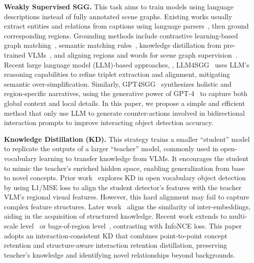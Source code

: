 \textbf{Weakly Supervised SGG.} This task aims to train models using language descriptions instead of fully annotated scene graphs. Existing works usually extract entities and relations from captions using language parsers~\cite{schuster2015generating}, then ground corresponding regions. Grounding methods include contrastive learning-based graph matching~\cite{shi2021simple}, semantic matching rules~\cite{zhong2021learning}, knowledge distillation from pre-trained VLMs~\cite{li2022integrating}, and aligning regions and words for scene graph supervision~\cite{zhang2023learning}. Recent large language model (LLM)-based approaches, \eg, LLM4SGG~\cite{kim2024llm4sgg} uses LLM’s reasoning capabilities to refine triplet extraction and alignment, mitigating semantic over-simplification. Similarly, GPT4SGG~\cite{chen2023gpt4sgg} synthesizes holistic and region-specific narratives, using the generative power of GPT-4~\cite{openai2023gpt} to capture both global context and local details. In this paper, we propose a simple and efficient method that only use LLM to generate counter-actions involved in bidirectional interaction prompts to improve interacting object detection accuracy.

\textbf{Knowledge Distillation (KD).}
This strategy trains a smaller ``student'' model to replicate the outputs of a larger ``teacher'' model, commonly used in open-vocabulary learning to transfer knowledge from VLMs. It encourages the student to mimic the teacher's enriched hidden space, enabling generalization from base to novel concepts. Prior work~\cite{gu2021open,zang2022open} explores KD in open vocabulary object detection by using L1/MSE loss to align the student detector's features with the teacher VLM's regional visual features. 
However, this hard alignment may fail to capture complex feature structures. Later work~\cite{NEURIPS2022_dabf6125} aligns the similarity of inter-embeddings, aiding in the acquisition of structured knowledge. Recent work extends to multi-scale level~\cite{wang2023object} or bags-of-region level~\cite{wu2023aligning}, contrasting with InfoNCE loss. This paper adopts an interaction-consistent KD that combines point-to-point concept retention and structure-aware interaction retention distillation, preserving teacher's knowledge and identifying novel relationships beyond backgrounds.